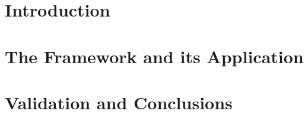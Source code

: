 \documentclass[ twoside,openright,titlepage,numbers=noenddot,headinclude,%
                footinclude=true,cleardoublepage=empty,abstractoff, %
                BCOR=5mm,paper=a4,fontsize=11pt,%
                ngerman,american,%
                ]{scrreprt}
\begin{document}
\frenchspacing
\raggedbottom
{} %
\pagestyle{plain}

%
%
\pagestyle{scrheadings}
\cleardoublepage
\cleardoublepage{}
\cleardoublepage
\part{Introduction}
%
%
\part{The Framework and its Application}

%
%
\part{Validation and Conclusions}
%
%
\cleardoublepage
\end{document}

